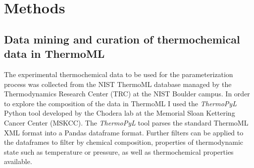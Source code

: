 \documentclass[rmp,nofootinbib,superscriptaddress,12pt,tightenlines,notitlepage]{revtex4-1}
\begin{document}
\section{Methods}
\subsection{Data mining and curation of thermochemical data in ThermoML}
The experimental thermochemical data to be used for the parameterization process was collected from the NIST ThermoML database managed by the 
Thermodynamics Research Center (TRC) at the NIST Boulder campus. In order to explore the composition of the data in ThermoML I used the \textit{ThermoPyL}
Python tool developed by the Chodera lab at the Memorial Sloan Kettering Cancer Center (MSKCC).\cite{thermopyl} The \textit{ThermoPyL} tool parses the
standard ThermoML XML format into a Pandas dataframe format. Further filters can be applied to the dataframes to filter by chemical composition, 
properties of thermodynamic state such as temperature or pressure, as well as thermochemical properties available.
\end{document}
